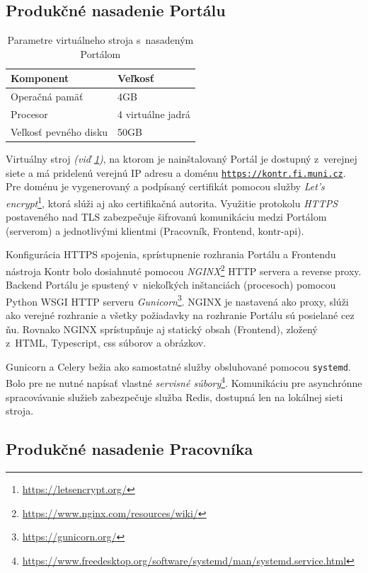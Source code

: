 \documentclass[
  digital, %
  oneside, %
  table,   %
  lof,     %
  lot,   %
]{fithesis3}
\newcommand*{\footurl}[1]{\footnote{\url{#1}}}
\begin{document}
\subsection{Produkčné nasadenie Portálu}

\begin{table}[h]
\begin{tabular}{l l}
Komponent & Veľkosť \\ [0.5ex] 
\hline
Operačná pamäť & 4GB  \\
Procesor & 4 virtuálne jadrá  \\
Veľkosť pevného disku&  50GB \\
\end{tabular}

\caption{Parametre virtuálneho stroja s~nasadeným Portálom} \label{tab:machine-portal}

\end{table}

Virtuálny stroj \emph{(viď \ref{tab:machine-portal})}, na ktorom je nainštalovaný Portál je dostupný z~verejnej siete a má pridelenú verejnú IP adresu a doménu \texttt{\url{https://kontr.fi.muni.cz}}. Pre doménu je vygenerovaný a podpísaný certifikát pomocou služby \emph{Let's encrypt}\footnote{\url{https://letsencrypt.org/}}, ktorá slúži aj ako certifikačná autorita. Využitie protokolu \emph{HTTPS}\cite{RFC2818} postaveného nad TLS\cite{RFC8446} zabezpečuje šifrovanú komunikáciu medzi Portálom (serverom) a jednotlivými klientmi (Pracovník, Frontend, kontr-api).

Konfigurácia HTTPS spojenia, sprístupnenie rozhrania Portálu a Frontendu nástroja Kontr bolo dosiahnuté pomocou \textit{NGINX}\footnote{\url{https://www.nginx.com/resources/wiki/}} HTTP servera a reverse proxy. Backend Portálu je spustený v~niekoľkých inštanciách (procesoch) pomocou Python WSGI HTTP serveru \emph{Gunicorn}\footurl{https://gunicorn.org/}. NGINX je nastavená ako proxy, slúži ako verejné rozhranie a všetky požiadavky na rozhranie Portálu sú posielané cez ňu. Rovnako NGINX sprístupňuje aj statický obsah (Frontend), zložený z~HTML, Typescript, css súborov a obrázkov.

Gunicorn a Celery bežia ako samostatné služby obsluhované pomocou \texttt{systemd}. Bolo pre ne nutné napísať vlastné \emph{servisné súbory}\footnote{\url{https://www.freedesktop.org/software/systemd/man/systemd.service.html}}. Komunikáciu pre asynchrónne spracovávanie služieb zabezpečuje služba Redis, dostupná len na lokálnej sieti stroja.

\subsection{Produkčné nasadenie Pracovníka}
\end{document}

